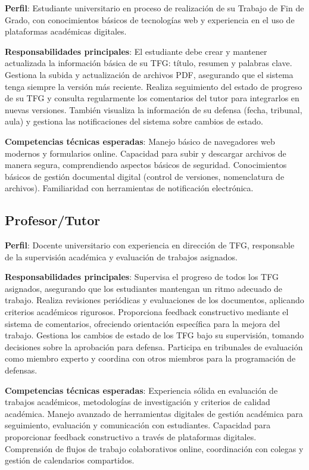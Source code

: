 \documentclass[12pt,a4paper,oneside]{report}
\begin{document}
\textbf{Perfil}: Estudiante universitario en proceso de realización de
su Trabajo de Fin de Grado, con conocimientos básicos de tecnologías web
y experiencia en el uso de plataformas académicas digitales.

\textbf{Responsabilidades principales}: El estudiante debe crear y mantener actualizada la información básica de su TFG: título, resumen y palabras clave. Gestiona la subida y actualización de archivos PDF, asegurando que el sistema tenga siempre la versión más reciente. Realiza seguimiento del estado de progreso de su TFG y consulta regularmente los comentarios del tutor para integrarlos en nuevas versiones. También visualiza la información de su defensa (fecha, tribunal, aula) y gestiona las notificaciones del sistema sobre cambios de estado.

\textbf{Competencias técnicas esperadas}: Manejo básico de navegadores web modernos y formularios online. Capacidad para subir y descargar archivos de manera segura, comprendiendo aspectos básicos de seguridad. Conocimientos básicos de gestión documental digital (control de versiones, nomenclatura de archivos). Familiaridad con herramientas de notificación electrónica.

\subsection{Profesor/Tutor}\label{profesortutor}

\textbf{Perfil}: Docente universitario con experiencia en dirección de
TFG, responsable de la supervisión académica y evaluación de trabajos
asignados.

\textbf{Responsabilidades principales}: Supervisa el progreso de todos los TFG asignados, asegurando que los estudiantes mantengan un ritmo adecuado de trabajo. Realiza revisiones periódicas y evaluaciones de los documentos, aplicando criterios académicos rigurosos. Proporciona feedback constructivo mediante el sistema de comentarios, ofreciendo orientación específica para la mejora del trabajo. Gestiona los cambios de estado de los TFG bajo su supervisión, tomando decisiones sobre la aprobación para defensa. Participa en tribunales de evaluación como miembro experto y coordina con otros miembros para la programación de defensas.

\textbf{Competencias técnicas esperadas}: Experiencia sólida en evaluación de trabajos académicos, metodologías de investigación y criterios de calidad académica. Manejo avanzado de herramientas digitales de gestión académica para seguimiento, evaluación y comunicación con estudiantes. Capacidad para proporcionar feedback constructivo a través de plataformas digitales. Comprensión de flujos de trabajo colaborativos online, coordinación con colegas y gestión de calendarios compartidos.
\end{document}
